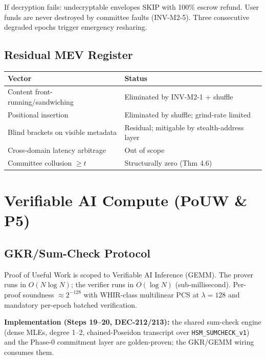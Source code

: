 \documentclass[11pt, a4paper]{article}
\begin{document}
If decryption fails: undecryptable envelopes SKIP with 100\% escrow refund. User funds are never destroyed by committee faults (INV-M2-5). Three consecutive degraded epochs trigger emergency resharing.

\subsection{Residual MEV Register}

\begin{center}
\begin{tabular}{l|l}
\textbf{Vector} & \textbf{Status} \\
\hline
Content front-running/sandwiching & Eliminated by INV-M2-1 + shuffle \\
Positional insertion & Eliminated by shuffle; grind-rate limited \\
Blind brackets on visible metadata & Residual; mitigable by stealth-address layer \\
Cross-domain latency arbitrage & Out of scope \\
Committee collusion $\ge t$ & Structurally zero (Thm 4.6) \\
\end{tabular}
\end{center}

\section{Verifiable AI Compute (PoUW \& P5)}

\subsection{GKR/Sum-Check Protocol}

Proof of Useful Work is scoped to Verifiable AI Inference (GEMM). The prover runs in $O(N \log N)$; the verifier runs in $O(\log N)$ (sub-millisecond). Per-proof soundness $\approx 2^{-128}$ with WHIR-class multilinear PCS at $\lambda = 128$ and mandatory per-epoch batched verification.

\textbf{Implementation (Steps 19--20, DEC-212/213):} the shared sum-check engine (dense MLEs,
degree 1--2, chained-Poseidon transcript over \texttt{HSM\_SUMCHECK\_v1}) and the Phase-0
commitment layer are golden-proven; the GKR/GEMM wiring consumes them.
\end{document}
